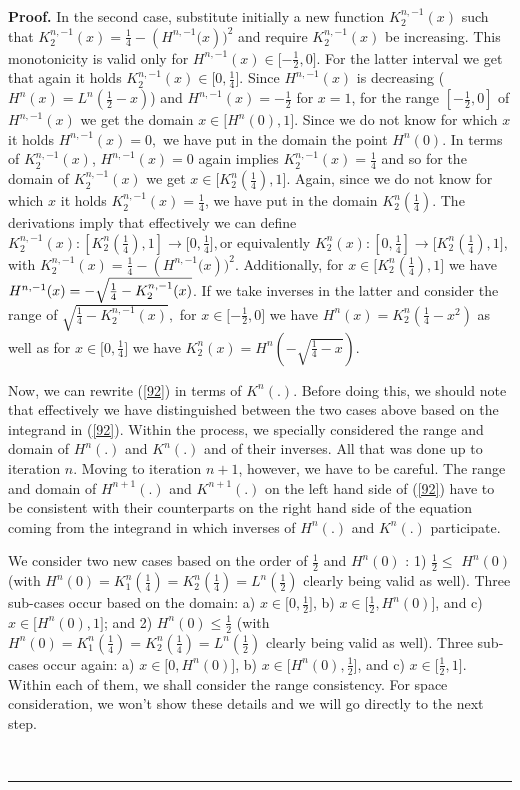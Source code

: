 \documentclass[onecolumn]{article}
\newenvironment{proof}[1][Proof]{\noindent\textbf{#1.} }{\ \rule{0.5em}{0.5em}}
\begin{document}
\begin{proof}
In the second case, substitute initially a new function $K_{2}^{n,-1}(x)$
such that $K_{2}^{n,-1}(x)=\frac{1}{4}-\left( H^{n,-1}(x\right) )^{2}$ and
require $K_{2}^{n,-1}(x)$ be increasing. This monotonicity is valid only for 
$H^{n,-1}(x)\in \lbrack -\frac{1}{2},0].$ For the latter interval we get
that again it holds $K_{2}^{n,-1}(x)\in \lbrack 0,\frac{1}{4}]$. Since $%
H^{n,-1}(x)$ is decreasing ($H^{n}(x)=L^{n}(\frac{1}{2}-x)$) and $%
H^{n,-1}(x)=-\frac{1}{2}$ for $x=1$, for the range $[-\frac{1}{2},0]$ of $%
H^{n,-1}(x)$ we get the domain $x\in \lbrack H^{n}(0),1]$. Since we do not
know for which $x$ it holds $H^{n,-1}(x)=0,$ we have put in the domain the
point $H^{n}(0)$. In terms of $K_{2}^{n,-1}(x)$, $H^{n,-1}(x)=0$ again
implies $K_{2}^{n,-1}(x)=\frac{1}{4}$ and so for the domain of $%
K_{2}^{n,-1}(x)$ we get $x\in \lbrack K_{2}^{n}(\frac{1}{4}),1]$. Again,
since we do not know for which $x$ it holds $K_{2}^{n,-1}(x)=\frac{1}{4}$,
we have put in the domain $K_{2}^{n}(\frac{1}{4})$. The derivations imply
that effectively we can define $K_{2}^{n,-1}(x):[K_{2}^{n}(\frac{1}{4}%
),1]\rightarrow \lbrack 0,\frac{1}{4}],$or equivalently $K_{2}^{n}(x):[0,%
\frac{1}{4}]\rightarrow \lbrack K_{2}^{n}(\frac{1}{4}),1],$ with $%
K_{2}^{n,-1}(x)=\frac{1}{4}-\left( H^{n,-1}(x\right) )^{2}$. Additionally,
for $x\in \lbrack K_{2}^{n}(\frac{1}{4}),1]$ we have $H^{n,-1}(x)=-\sqrt{%
\frac{1}{4}-K_{2}^{n,-1}(x)}$. If we take inverses in the latter and
consider the range of $\sqrt{\frac{1}{4}-K_{2}^{n,-1}(x)},$ for $x\in
\lbrack -\frac{1}{2},0]$ we have $H^{n}(x)=K_{2}^{n}(\frac{1}{4}-x^{2})$ as
well as for $x\in \lbrack 0,\frac{1}{4}]$ we have $K_{2}^{n}(x)=H^{n}\left( -%
\sqrt{\frac{1}{4}-x}\right) .$

Now, we can rewrite (\ref{92}) in terms of $K^{n}(.)$. Before doing this, we
should note that effectively we have distinguished between the two cases
above based on the integrand in (\ref{92}). Within the process, we specially
considered the range and domain of $H^{n}(.)$ and $K^{n}(.)$ and of their
inverses. All that was done up to iteration $n$. Moving to iteration $n+1$,
however, we have to be careful. The range and domain of $H^{n+1}(.)$ and $%
K^{n+1}(.)$ on the left hand side of (\ref{92}) have to be consistent with
their counterparts on the right hand side of the equation coming from the
integrand in which inverses of $H^{n}(.)$ and $K^{n}(.)$ participate.

We consider two new cases based on the order of $\frac{1}{2}$ and $H^{n}(0)$%
: 1) $\frac{1}{2}\leq $ $H^{n}(0)$ (with $H^{n}(0)=K_{1}^{n}(\frac{1}{4}%
)=K_{2}^{n}(\frac{1}{4})=L^{n}(\frac{1}{2})$ clearly being valid as well).
Three sub-cases occur based on the domain: a) $x\in \lbrack 0,\frac{1}{2}]$,
b) $x\in \lbrack \frac{1}{2},H^{n}(0)]$, and c) $x\in \lbrack H^{n}(0),1]$;
and 2) $H^{n}(0)\leq \frac{1}{2}$ (with $H^{n}(0)=K_{1}^{n}(\frac{1}{4}%
)=K_{2}^{n}(\frac{1}{4})=L^{n}(\frac{1}{2})$ clearly being valid as well).
Three sub-cases occur again: a) $x\in \lbrack 0,H^{n}(0)]$, b) $x\in \lbrack
H^{n}(0),\frac{1}{2}]$, and c) $x\in \lbrack \frac{1}{2},1]$. Within each of
them, we shall consider the range consistency. For space consideration, we
won't show these details and we will go directly to the next step.


\end{proof}
\end{document}
